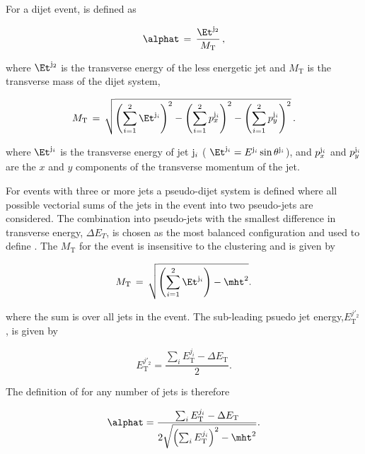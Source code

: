 For a dijet event, \alphat is defined as

\begin{equation}
\label{eq:alphat}
\alphat\, =\, \frac{\Et^{{\rm j}_2}}{M_\text{T}} \, ,
\end{equation}

where $\Et^{\rm j_2}$ is the transverse energy of the 
less energetic jet and $M_\text{T}$ is the transverse
mass of the dijet system, 

\begin{equation}
  \label{eq:mt}
  M_\text{T}\, = \,\sqrt{ \left( \sum_{i=1}^2 \Et^{{\rm j}_i}
    \right)^2 - \left( \sum_{i=1}^2 p_x^{{\rm j}_i} \right)^2 - \left(
      \sum_{i=1}^2 p_y^{{\rm j}_i} \right)^2} \, .
\end{equation}

where $\Et^{{\rm j}_i}$ is the transverse energy of jet ${\rm j}_i$ (
$\Et^{{\rm j}_i} = E^{{\rm j}_i}\sin\theta^{{\rm j}_i}$), and
$p_x^{{\rm j}_i}$ and $p_y^{{\rm j}_i}$ are the $x$ and $y$ components
of the transverse momentum of the jet. 

For events with three or more jets a pseudo-dijet system is defined 
where all possible vectorial sums of the jets in the event into two
pseudo-jets are considered. The combination into pseudo-jets 
with the smallest difference in transverse energy, $\Delta E_T$, is chosen
as the most balanced configuration and used to define \alphat. The $M_\text{T}$ for 
the event is insensitive to the clustering and is given by

\begin{equation}
  \label{eq:mt_njet}
  M_\text{T}\, = \,\sqrt{ \left( \sum_{i=1}^2 \Et^{{\rm{j}}_i}
    \right) - \mht^2}.
\end{equation}

where the sum is over all jets in the event. The sub-leading psuedo jet energy,$E_{\textrm{T}}^{j'_2}$, 
is given by

\begin{equation}
E_{\textrm{T}}^{j'_2} = \frac{\sum_{i} E_{\textrm{T}}^{j_i} - \Delta E_{\textrm{T}}}{2}.
\end{equation}

The definition of \alphat for any number of jets is therefore

\begin{equation}
  \label{eq:alphat2}
   \alphat = \frac{\sum_{i} E_{\textrm{T}}^{j_i} - \Delta E_{\textrm{T}}}{2\sqrt{\left(\sum_{i} E_{\textrm{T}}^{j_i}\right)^2 - \mht^2}}.
\end{equation}

